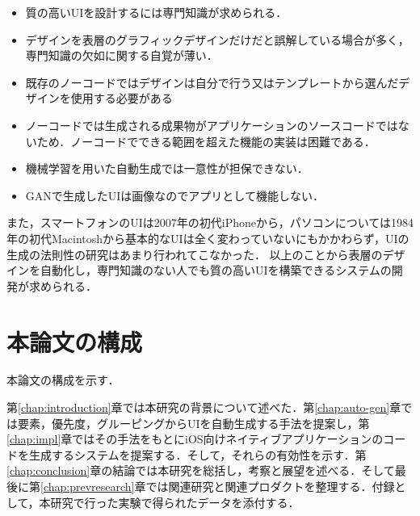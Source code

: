 \begin{itemize}
	\item 質の高いUIを設計するには専門知識が求められる．
	\item デザインを表層のグラフィックデザインだけだと誤解している場合が多く，専門知識の欠如に関する自覚が薄い．
	\item 既存のノーコードではデザインは自分で行う又はテンプレートから選んだデザインを使用する必要がある
	\item ノーコードでは生成される成果物がアプリケーションのソースコードではないため．ノーコードでできる範囲を超えた機能の実装は困難である．
	\item 機械学習を用いた自動生成では一意性が担保できない．
	\item GANで生成したUIは画像なのでアプリとして機能しない．
\end{itemize}
また，スマートフォンのUIは2007年の初代iPhoneから，パソコンについては1984年の初代Macintoshから基本的なUIは全く変わっていないにもかかわらず，UIの生成の法則性の研究はあまり行われてこなかった．
以上のことから表層のデザインを自動化し，専門知識のない人でも質の高いUIを構築できるシステムの開発が求められる．


\section{本論文の構成}

本論文の構成を示す．

第\ref{chap:introduction}章では本研究の背景について述べた．第\ref{chap:auto-gen}章では要素，優先度，グルーピングからUIを自動生成する手法を提案し，第\ref{chap:impl}章ではその手法をもとにiOS向けネイティブアプリケーションのコードを生成するシステムを提案する．そして，それらの有効性を示す．第\ref{chap:conclusion}章の結論では本研究を総括し，考察と展望を述べる．そして最後に第\ref{chap:prevresearch}章では関連研究と関連プロダクトを整理する．付録として，本研究で行った実験で得られたデータを添付する．
